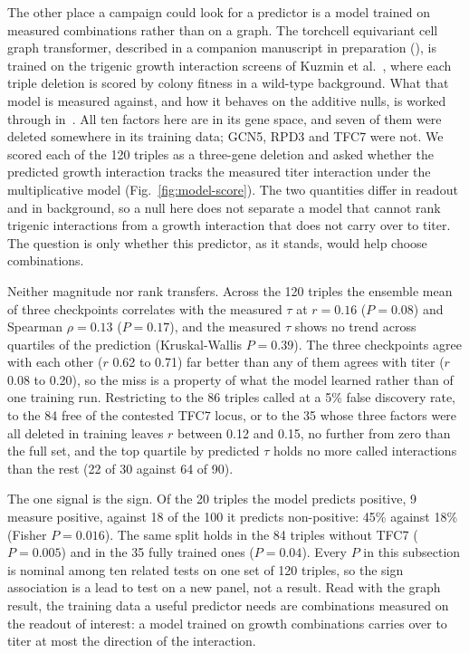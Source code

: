 The other place a campaign could look for a predictor is a model trained on measured
combinations rather than on a graph. The torchcell equivariant cell graph transformer,
described in a companion manuscript in preparation
(), is trained on the trigenic growth interaction
screens of Kuzmin et al.~\citep{kuzminSystematicAnalysisComplex2018,kuzminExploringWholegenomeDuplicate2020},
where each triple deletion is scored by colony fitness in a wild-type background. What that
model is measured against, and how it behaves on the additive nulls, is worked through
in~\citep{volkWhat010Trigenic2026}. All ten
factors here are in its gene space, and seven of them were deleted somewhere in its
training data; GCN5, RPD3 and TFC7 were not. We scored each of the 120 triples as a
three-gene deletion and asked whether the predicted growth interaction tracks the measured
titer interaction under the multiplicative model (Fig.~\ref{fig:model-score}). The two
quantities differ in readout and in background, so a null here does not separate a model
that cannot rank trigenic interactions from a growth interaction that does not carry over to
titer. The question is only whether this predictor, as it stands, would help choose
combinations.

Neither magnitude nor rank transfers. Across the 120 triples the ensemble mean of three
checkpoints correlates with the measured $\tau$ at $r = 0.16$ ($P = 0.08$) and Spearman
$\rho = 0.13$ ($P = 0.17$), and the measured $\tau$ shows no trend across quartiles of the
prediction (Kruskal-Wallis $P = 0.39$). The three checkpoints agree with each other ($r$
0.62 to 0.71) far better than any of them agrees with titer ($r$ 0.08 to 0.20), so the miss
is a property of what the model learned rather than of one training run. Restricting to
the 86 triples called at a 5\% false discovery rate, to the 84 free of the contested TFC7
locus, or to the 35 whose three factors were all deleted in training leaves $r$ between
0.12 and 0.15, no further from zero than the full set, and the top quartile by predicted $\tau$ holds
no more called interactions than the rest (22 of 30 against 64 of 90).

The one signal is the sign. Of the 20 triples the model predicts positive, 9 measure
positive, against 18 of the 100 it predicts non-positive: 45\% against 18\% (Fisher
$P = 0.016$). The same split holds in the 84 triples without TFC7 ($P = 0.005$) and in the
35 fully trained ones ($P = 0.04$). Every $P$ in this subsection is nominal among ten
related tests on one set of 120 triples, so the sign association is a lead to test on a new
panel, not a result. Read with the graph result, the training data a useful predictor needs
are combinations measured on the readout of interest: a model trained on growth
combinations carries over to titer at most the direction of the interaction.

